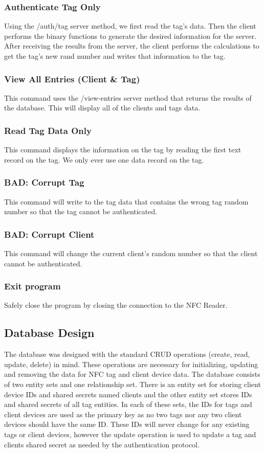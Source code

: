 \subsubsection{Authenticate Tag Only}
Using the /auth/tag server method, we first read the tag’s data. Then the client performs the binary functions to generate the desired information for the server. After receiving the results from the server, the client performs the calculations to get the tag’s new rand number and writes that information to the tag. 
\subsubsection{View All Entries (Client \& Tag)}
This command uses the /view-entries server method that returns the results of the database. This will display all of the clients and tags data. 
\subsubsection{Read Tag Data Only}
This command displays the information on the tag by reading the first text record on the tag. We only ever use one data record on the tag. 
\subsubsection{BAD: Corrupt Tag}
This command will write to the tag data that contains the wrong tag random number so that the tag cannot be authenticated. 
\subsubsection{BAD: Corrupt Client}
This command will change the current client’s random number so that the client cannot be authenticated. 
\subsubsection{Exit program}
Safely close the program by closing the connection to the NFC Reader. 


\subsection{Database Design}
\label{db-design}
The database was designed with the standard CRUD operations (create, read, update, delete) in mind. These operations are necessary for initializing, updating and removing the data for NFC tag and client device data. The database consists of two entity sets and one relationship set. There is an entity set for storing client device IDs and shared secrets named clients and the other entity set stores IDs and shared secrets of all tag entities. In each of these sets, the IDs for tags and client devices are used as the primary key as no two tags nor any two client devices should have the same ID. These IDs will never change for any existing tags or client devices, however the update operation is used to update a tag and clients shared secret as needed by the authentication protocol.\\

